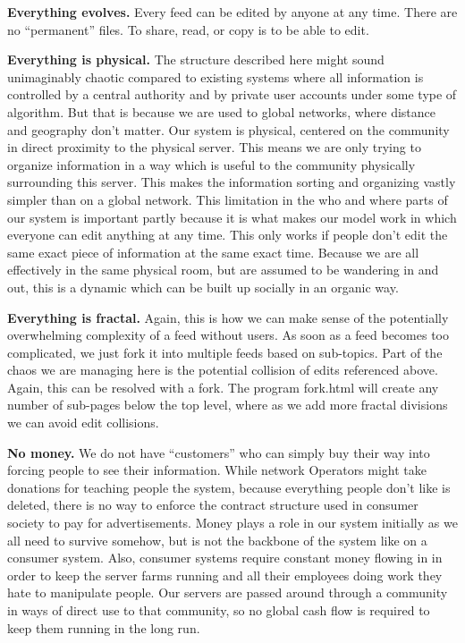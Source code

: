 \textbf{Everything evolves.}  Every feed can be edited by anyone at any time. There are no ``permanent'' files. To share, read, or copy is to be able to edit.

\textbf{Everything is physical.}  The structure described here might sound unimaginably chaotic compared to existing systems where all information is controlled by a central authority and by private user accounts under some type of algorithm.  But that is because we are used to global networks, where distance and geography don't matter. Our system is physical, centered on the community in direct proximity to the physical server.  This means we are only trying to organize information in a way which is useful to the community physically surrounding this server.  This makes the information sorting and organizing vastly simpler than on a global network.  This limitation in the who and where parts of our system is important partly because it is what makes our model work in which everyone can edit anything at any time.  This only works if people don't edit the same exact piece of information at the same exact time.  Because we are all effectively in the same physical room, but are assumed to be wandering in and out, this is a dynamic which can be built up socially in an organic way.

\textbf{Everything is fractal.}  Again, this is how we can make sense of the potentially overwhelming complexity of a feed without users. As soon as a feed becomes too complicated, we just fork it into multiple feeds based on sub-topics.  Part of the chaos we are managing here is the potential collision of edits referenced above.  Again, this can be resolved with a fork.  The program fork.html will create any number of sub-pages below the top level, where as we add more fractal divisions we can avoid edit collisions.
   
\textbf{No money.}  We do not have ``customers'' who can simply buy their way into forcing people to see their information.  While network Operators might take donations for teaching people the system, because everything people don't like is deleted, there is no way to enforce the contract structure used in consumer society to pay for advertisements.  Money plays a role in our system initially as we all need to survive somehow, but is not the backbone of the system like on a consumer system.  Also, consumer systems require constant money flowing in in order to keep the server farms running and all their employees doing work they hate to manipulate people.  Our servers are passed around through a community in ways of direct use to that community, so no global cash flow is required to keep them running in the long run.

